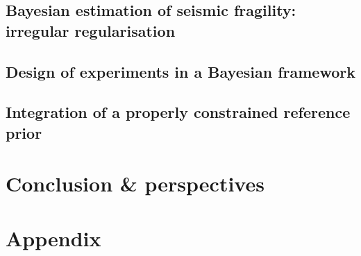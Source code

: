 \documentclass[a4paper]{book}
\begin{document}
\chapter{Bayesian estimation of seismic fragility: irregular regularisation}


\chapter{Design of experiments in a Bayesian framework}


\chapter{Integration of a properly constrained reference prior}




\part{Conclusion \& perspectives}



\part*{Appendix}
\end{document}
